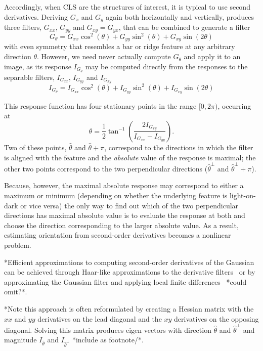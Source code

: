 \documentclass{IEEEtran}
\def\Gxx{G_{xx}}
\def\Gxy{G_{xy}}
\def\Gyx{G_{yx}}
\def\Gyy{G_{yy}}
\def\Ixx{I_{G_{xx}}}
\def\Ixy{I_{G_{xy}}}
\def\Iyy{I_{G_{yy}}}
\begin{document}
Accordingly, when CLS are the structures of interest, it is typical to use second derivatives. Deriving $G_x$ and $G_y$ again both horizontally and vertically, produces three filters, $\Gxx$, $\Gyy$ and $\Gxy = \Gyx$, that can be combined to generate a filter
%
\begin{equation}
G_\theta = \Gxx \cos^2(\theta) + \Gyy \sin^2(\theta) + \Gxy \sin(2\theta)
\label{e:secondderivs_filter}
\end{equation}
%
with even symmetry that resembles a bar or ridge feature at any arbitrary direction $\theta$. However, we need never actually compute $G_\theta$ and apply it to an image, as its response $I_{G_{\theta}}$ may be computed directly from the responses to the separable filters, $\Ixx$, $\Iyy$ and $\Ixy$
%
\begin{equation}
I_{G_\theta} = \Ixx \cos^2(\theta) + \Iyy \sin^2(\theta) + \Ixy \sin(2\theta)
\label{e:secondderivs_response}
\end{equation}

This response function has four stationary points in the range $[0,2\pi)$, occurring at
%
\begin{equation}
\theta = \frac{1}{2} \tan^{-1}\left( \frac{2\Ixy}{\Ixx-\Iyy} \right).
\label{e:secondderivs_orientation}
\end{equation}
%
\noindent Two of these points, $\hat{\theta}$ and $\hat{\theta}+\pi$, correspond to the directions in which the filter is aligned with the feature and the \emph{absolute} value of the response is maximal; the other two points correspond to the two perpendicular directions ($\hat{\theta}^\perp$ and $\hat{\theta}^\perp+\pi$).

Because, however, the maximal absolute response may correspond to either a maximum or minimum (depending on whether the underlying feature is light-on-dark or vice versa) the only way to find out which of the two perpendicular directions has maximal absolute value is to evaluate the response at both and choose the direction corresponding to the larger absolute value. As a result, estimating orientation from second-order derivatives becomes a nonlinear problem.

*Efficient approximations to computing second-order derivatives of the Gaussian can be achieved through Haar-like approximations to the derivative filters~\cite{Bay_etal_CVIU08} or by approximating the Gaussian filter and applying local finite differences~\cite{Kovesi_DICTA10} *could omit?*.

*Note this approach is often reformulated by creating a Hessian matrix \cite{} with the $xx$ and $yy$ derivatives on the lead diagonal and the $xy$ derivatives on the opposing diagonal. Solving this matrix produces eigen vectors with direction $\hat{\theta}$ and $\hat{\theta}^\perp$ and magnitude $I_{\hat{\theta}}$ and $I_{\hat{\theta}^\perp}$ *include as footnote/*.
\end{document}
